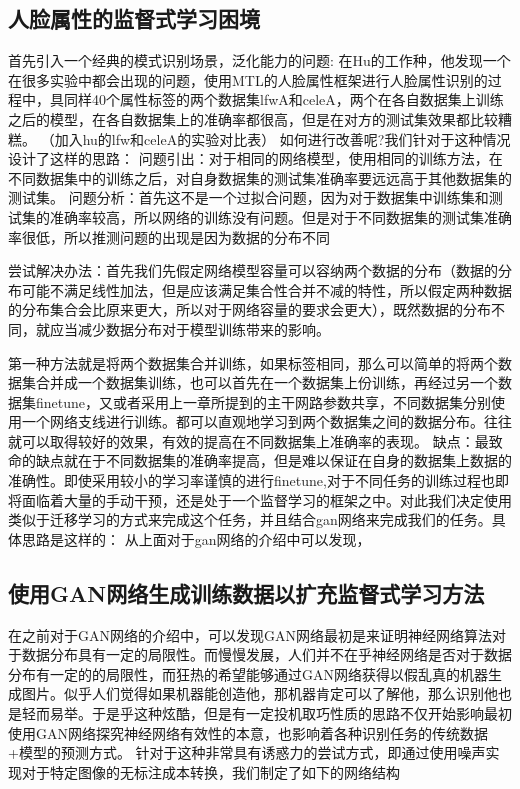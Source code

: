 \subsection{人脸属性的监督式学习困境}
首先引入一个经典的模式识别场景，泛化能力的问题:
在Hu的工作种，他发现一个在很多实验中都会出现的问题，使用MTL的人脸属性框架进行人脸属性识别的过程中，具同样40个属性标签的两个数据集lfwA和celeA，两个在各自数据集上训练之后的模型，在各自数据集上的准确率都很高，但是在对方的测试集效果都比较糟糕。
（加入hu的lfw和celeA的实验对比表）
如何进行改善呢?我们针对于这种情况设计了这样的思路：
问题引出：对于相同的网络模型，使用相同的训练方法，在不同数据集中的训练之后，对自身数据集的测试集准确率要远远高于其他数据集的测试集。
问题分析：首先这不是一个过拟合问题，因为对于数据集中训练集和测试集的准确率较高，所以网络的训练没有问题。但是对于不同数据集的测试集准确率很低，所以推测问题的出现是因为数据的分布不同

尝试解决办法：首先我们先假定网络模型容量可以容纳两个数据的分布（数据的分布可能不满足线性加法，但是应该满足集合性合并不减的特性，所以假定两种数据的分布集合会比原来更大，所以对于网络容量的要求会更大），既然数据的分布不同，就应当减少数据分布对于模型训练带来的影响。

第一种方法就是将两个数据集合并训练，如果标签相同，那么可以简单的将两个数据集合并成一个数据集训练，也可以首先在一个数据集上份训练，再经过另一个数据集finetune，又或者采用上一章所提到的主干网路参数共享，不同数据集分别使用一个网络支线进行训练。都可以直观地学习到两个数据集之间的数据分布。往往就可以取得较好的效果，有效的提高在不同数据集上准确率的表现。
缺点：最致命的缺点就在于不同数据集的准确率提高，但是难以保证在自身的数据集上数据的准确性。即使采用较小的学习率谨慎的进行finetune,对于不同任务的训练过程也即将面临着大量的手动干预，还是处于一个监督学习的框架之中。对此我们决定使用类似于迁移学习的方式来完成这个任务，并且结合gan网络来完成我们的任务。具体思路是这样的：
从上面对于gan网络的介绍中可以发现，
\subsection{使用GAN网络生成训练数据以扩充监督式学习方法}
在之前对于GAN网络的介绍中，可以发现GAN网络最初是来证明神经网络算法对于数据分布具有一定的局限性。而慢慢发展，人们并不在乎神经网络是否对于数据分布有一定的的局限性，而狂热的希望能够通过GAN网络获得以假乱真的机器生成图片。似乎人们觉得如果机器能创造他，那机器肯定可以了解他，那么识别他也是轻而易举。于是乎这种炫酷，但是有一定投机取巧性质的思路不仅开始影响最初使用GAN网络探究神经网络有效性的本意，也影响着各种识别任务的传统数据+模型的预测方式。
针对于这种非常具有诱惑力的尝试方式，即通过使用噪声实现对于特定图像的无标注成本转换，我们制定了如下的网络结构

